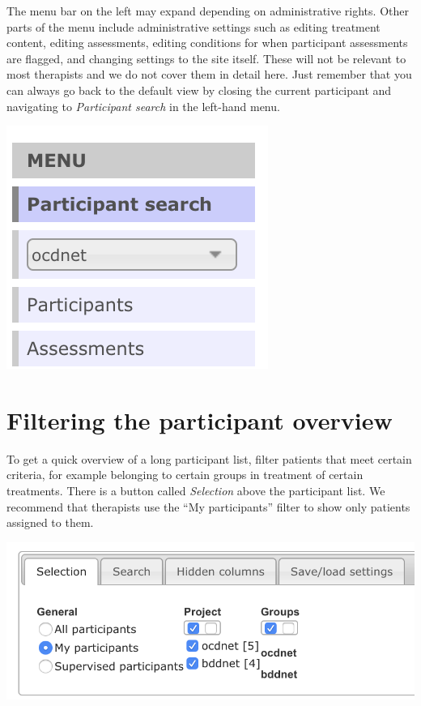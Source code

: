 \documentclass[]{book}
\begin{document}
The menu bar on the left may expand depending on administrative rights. Other parts of the menu include administrative settings such as editing treatment content, editing assessments, editing conditions for when participant assessments are flagged, and changing settings to the site itself. These will not be relevant to most therapists and we do not cover them in detail here. Just remember that you can always go back to the default view by closing the current participant and navigating to \emph{Participant search} in the left-hand menu.

\includegraphics{images/therapist-menu.png}

\hypertarget{filtering-the-participant-overview}{%
\section{Filtering the participant overview}\label{filtering-the-participant-overview}}

To get a quick overview of a long participant list, filter patients that meet certain criteria, for example belonging to certain groups in treatment of certain treatments. There is a button called \emph{Selection} above the participant list. We recommend that therapists use the ``My participants'' filter to show only patients assigned to them.

\includegraphics{images/filter-participants.png}
\end{document}
